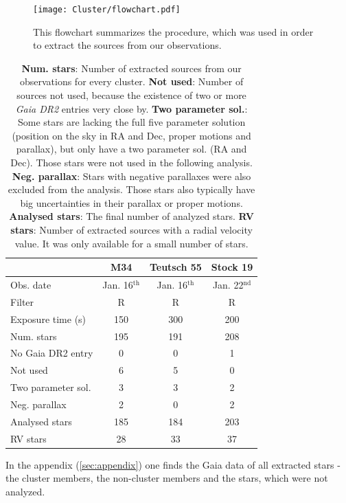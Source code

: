 \documentclass{article}
\begin{document}
\begin{figure}[H]
  \centering
    \texttt{[image: Cluster/flowchart.pdf]}
  \caption{This flowchart summarizes the procedure, which was used in order to extract the sources from our observations.}
  \label{fig:flowchart}
\end{figure}

\begin{table}[H]
\centering
\caption{\textbf{Num. stars}: Number of extracted sources from our observations for every cluster. \textbf{Not used}: Number of sources not used, because the existence of two or more \textit{Gaia DR2} entries very close by. \textbf{Two parameter sol.}: Some stars are lacking the full five parameter solution (position on the sky in RA and Dec, proper motions and parallax), but only have a two parameter sol. (RA and Dec). Those stars were not used in the following analysis. \textbf{Neg. parallax}: Stars with negative parallaxes were also excluded from the analysis. Those stars also typically have big uncertainties in their parallax or proper motions. \textbf{Analysed stars}: The final number of analyzed stars. \textbf{RV stars}: Number of extracted sources with a radial velocity value. It was only available for a small number of stars.}
\label{tab:sources}
\begin{tabular}{l|c|c|c}
                   & M34       & Teutsch 55 & Stock 19  \\ \hline
Obs. date          & Jan. 16$^{\text{th}}$ & Jan. 16$^{\text{th}}$  & Jan. 22$^{\text{nd}}$ \\
Filter             & R         & R          & R         \\
Exposure time (s)  & 150       & 300        & 200       \\ \hline
Num. stars         & 195       & 191        & 208       \\
No Gaia DR2 entry  & 0         & 0          & 1         \\
Not used           & 6         & 5          & 0         \\
Two parameter sol. & 3         & 3          & 2         \\
Neg. parallax      & 2         & 0          & 2         \\
Analysed stars     & 185       & 184        & 203       \\
RV stars           & 28        & 33         & 37       
\end{tabular}
\end{table}

In the appendix (\ref{sec:appendix}) one finds the Gaia data of all extracted stars {-}the cluster members, the non-cluster members and the stars, which were not analyzed. 
\end{document}
